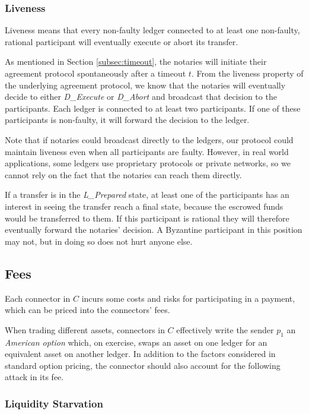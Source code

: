 \documentclass[letterpaper,twocolumn,10pt]{article}
\begin{document}
\subsubsection{Liveness}

Liveness means that every non-faulty ledger connected to at least one non-faulty, rational participant will eventually execute or abort its transfer.

As mentioned in Section \ref{subsec:timeout}, the notaries will initiate their agreement protocol spontaneously after a timeout $t$. From the liveness property of the underlying agreement protocol, we know that the notaries will eventually decide to either \textit{D\_Execute} or \textit{D\_Abort} and broadcast that decision to the participants. Each ledger is connected to at least two participants. If one of these participants is non-faulty, it will forward the decision to the ledger.

Note that if notaries could broadcast directly to the ledgers, our protocol could maintain liveness even when all participants are faulty. However, in real world applications, some ledgers use proprietary protocols or private networks, so we cannot rely on the fact that the notaries can reach them directly.

If a transfer is in the \textit{L\_Prepared} state, at least one of the participants has an interest in seeing the transfer reach a final state, because the escrowed funds would be transferred to them. If this participant is rational they will therefore eventually forward the notaries' decision. A Byzantine participant in this position may not, but in doing so does not hurt anyone else.


\subsection{Fees}
\label{subsec:fees}

Each connector in $C$ incurs some costs and risks for participating in a payment, which can be priced into the connectors' fees.

When trading different assets, connectors in $C$ effectively write the sender $p_1$ an \textit{American option} \cite{black1973pricing,brennan1977valuation}
which, on exercise, swaps an asset on one ledger for an equivalent asset on another ledger.
In addition to the factors considered in standard option pricing, the connector should also account for the following attack in its fee.


\subsubsection{Liquidity Starvation}
\end{document}
